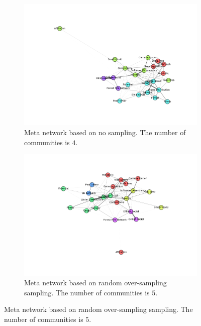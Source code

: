 \documentclass{article}
\begin{document}
\begin{figure}[H]
	\begin{subfigure}{0.48\textwidth}
	\includegraphics[width=\linewidth]{figs/similarity/SubDomain/None/graph_community.png}
	\caption{Meta network based on no sampling. The number of communities is $4$.} \label{no_graph_sub_community}
	\end{subfigure}\hspace*{\fill}
	\begin{subfigure}{0.48\textwidth}
	\includegraphics[width=\linewidth]{figs/similarity/SubDomain/RandomOver/graph_community.png}
	\caption{Meta network based on random over-sampling sampling.  The number of communities is $5$.} \label{random_over_graph_sub_community}
	\end{subfigure}
	

\end{figure}
\end{document}
